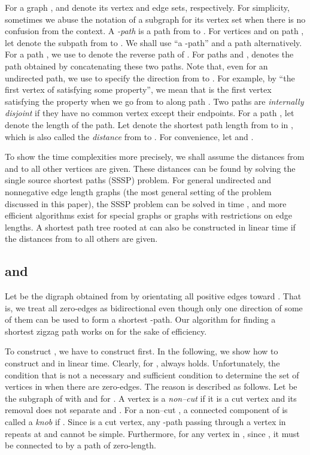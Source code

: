 \documentclass[review]{elsarticle}
\begin{document}
For a graph ,  and  denote its vertex and edge sets,
respectively. For simplicity, sometimes we abuse the notation of a
subgraph for its vertex set when there is no confusion from the
context. A {\em -path} is a path from  to . For vertices
 and  on path , let  denote the subpath from  to
. We shall use ``a -path'' and a path  alternatively.
For a path , we use  to denote the reverse path of .
For paths  and ,  denotes the path
obtained by concatenating these two paths. Note that, even for an
undirected path, we use  to specify the direction from 
to . For example, by ``the first vertex  of 
satisfying some property'', we mean that  is the first vertex
satisfying the property when we go from  to  along path .
Two paths are {\em internally disjoint} if they have no common
vertex except their endpoints. For a path , let  denote the length of the path. Let  denote the
shortest path length from  to  in , which is also called
the {\em distance} from  to . For convenience, let
 and .


To show the time complexities more precisely, we shall assume the
distances from  and  to all other vertices are given. These
distances can be found by solving the single source shortest paths
(SSSP) problem. For general undirected and nonnegative edge length
graphs (the most general setting of the problem discussed in this
paper), the SSSP problem can be solved in  time
\cite{cor01,fred87}, and more efficient algorithms exist for special
graphs or graphs with restrictions on edge lengths. A shortest path
tree rooted at  can also be constructed in linear time if the
distances from  to all others are given.

\subsection{ and }

Let  be the digraph obtained from  by orientating all
positive edges toward . That is, we treat all zero-edges as
bidirectional even though only one direction of some of them can be
used to form a shortest -path. Our algorithm for finding a
shortest zigzag path works on  for the sake of efficiency.

To construct , we have to construct  first. In the
following, we show how to construct  and  in linear time.
Clearly, for ,  always holds.
Unfortunately, the condition that  is not a
necessary and sufficient condition to determine the set of vertices
in  when there are zero-edges. The reason is described as
follows. Let  be the subgraph of  with
 and  for . A vertex is a
{\em non--cut} if it is a cut vertex and its removal does not
separate  and . For a non--cut , a connected component
 of  is called a {\em knob} if . Since 
is a cut vertex, any -path passing through a vertex in 
repeats at  and cannot be simple. Furthermore, for any vertex 
in , since , it must be connected to  by
a path of zero-length.
\end{document}
